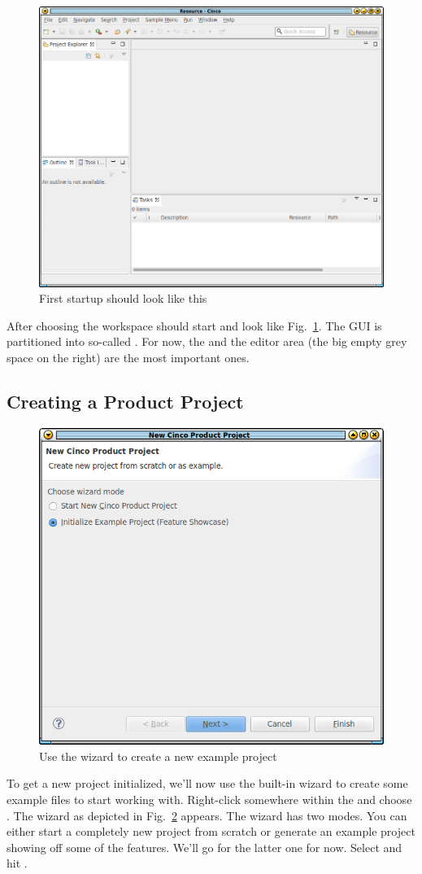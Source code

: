 \documentclass[a4paper,american,12pt]{scrreprt}
\begin{document}
\begin{figure}
	\centering
	\includegraphics[width=.7\textwidth]{screenshots/cinco-gui-firststart.png} 
	\caption{First startup should look like this}
	\label{fig:firstStart}
\end{figure}

After choosing the workspace \cinco should start and look like
Fig.~\ref{fig:firstStart}. The GUI is partitioned into so-called
. For now, the  and the editor area (the
big empty grey space on the right) are the most important ones. 

\subsection{Creating a \cinco Product Project}
\label{sec:wizard}

\begin{figure}
	\centering
	\includegraphics[width=.5\textwidth]{screenshots/new-cp-wizard.png}
	\caption{Use the wizard to create a new example project}
	\label{fig:cpWizard}
\end{figure}

To get a new  project initialized, we'll now use the
built-in wizard to create some example files to start working with.
Right-click somewhere within the  and choose . The wizard as depicted in Fig.~\ref{fig:cpWizard} appears. The wizard
has two modes. You can either start a completely new project from scratch or
generate an example project showing off some of the \cinco{} features. We'll go for
the latter one for now. Select  and hit . 
\end{document}
